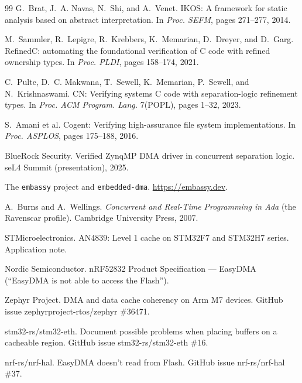 \documentclass[10pt,twocolumn]{article}
\begin{document}
\begin{thebibliography}{99}
 G.~Brat, J.~A. Navas, N.~Shi, and A.~Venet.
\newblock IKOS: A framework for static analysis based on abstract interpretation.
\newblock In \emph{Proc. SEFM}, pages 271--277, 2014.

 M.~Sammler, R.~Lepigre, R.~Krebbers, K.~Memarian, D.~Dreyer,
and D.~Garg.
\newblock RefinedC: automating the foundational verification of C code with
refined ownership types.
\newblock In \emph{Proc. PLDI}, pages 158--174, 2021.

 C.~Pulte, D.~C. Makwana, T.~Sewell, K.~Memarian, P.~Sewell, and
N.~Krishnaswami.
\newblock CN: Verifying systems C code with separation-logic refinement types.
\newblock In \emph{Proc. ACM Program. Lang.} 7(POPL), pages 1--32, 2023.

 S.~Amani et al.
\newblock Cogent: Verifying high-assurance file system implementations.
\newblock In \emph{Proc. ASPLOS}, pages 175--188, 2016.

 BlueRock Security.
\newblock Verified ZynqMP DMA driver in concurrent separation logic.
\newblock seL4 Summit (presentation), 2025.

 The \texttt{embassy} project and \texttt{embedded-dma}.
\newblock \url{https://embassy.dev}.

 A.~Burns and A.~Wellings.
\newblock \emph{Concurrent and Real-Time Programming in Ada} (the Ravenscar
profile).
\newblock Cambridge University Press, 2007.

 STMicroelectronics.
\newblock AN4839: Level 1 cache on STM32F7 and STM32H7 series.
\newblock Application note.

 Nordic Semiconductor.
\newblock nRF52832 Product Specification --- EasyDMA (``EasyDMA is not able to
access the Flash'').

 Zephyr Project.
\newblock DMA and data cache coherency on Arm M7 devices.
\newblock GitHub issue zephyrproject-rtos/zephyr \#36471.

 stm32-rs/stm32-eth.
\newblock Document possible problems when placing buffers on a cacheable region.
\newblock GitHub issue stm32-rs/stm32-eth \#16.

 nrf-rs/nrf-hal.
\newblock EasyDMA doesn't read from Flash.
\newblock GitHub issue nrf-rs/nrf-hal \#37.

\end{thebibliography}
\end{document}
